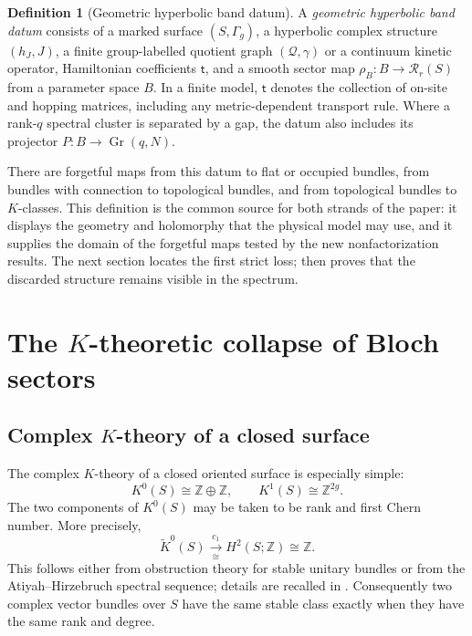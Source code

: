 \documentclass[11pt]{article}
\theoremstyle{definition}
\newtheorem{definition}[theorem]{Definition}
\theoremstyle{remark}
\newcommand{\ZZ}{\mathbb Z}
\newcommand{\cR}{\mathcal R}
\begin{document}
\begin{definition}[Geometric hyperbolic band datum]
\label{def:geometric-band-datum}
A \emph{geometric hyperbolic band datum} consists of a marked surface
\((S,\Gamma_g)\), a hyperbolic complex structure \((h_J,J)\), a finite
group-labelled quotient graph \((\mathcal Q,\gamma)\) or a continuum kinetic
operator, Hamiltonian coefficients \(\mathsf t\), and a smooth sector map
\(\rho_B:B\to\cR_r(S)\) from a parameter space \(B\).  In a finite model,
\(\mathsf t\) denotes the collection of on-site and hopping matrices,
including any metric-dependent transport rule.  Where a rank-\(q\) spectral
cluster is separated by a gap, the datum also includes its projector
\(P:B\to\operatorname{Gr}(q,N)\).
\end{definition}

There are forgetful maps from this datum to flat or occupied bundles, from
bundles with connection to topological bundles, and from topological bundles
to \(K\)-classes.  This definition is the common source for both strands of
the paper: it displays the geometry and holomorphy that the physical model
may use, and it supplies the domain of the forgetful maps tested by the new
nonfactorization results.  The next section locates the first strict loss;
 then proves that the discarded structure remains visible in
the spectrum.

\section{The \texorpdfstring{\(K\)}{K}-theoretic collapse of Bloch sectors}
\label{sec:k-collapse}

\subsection{Complex \texorpdfstring{\(K\)}{K}-theory of a closed surface}

The complex \(K\)-theory of a closed oriented surface is especially simple:
\[
       K^0(S)\cong \ZZ\oplus\ZZ,
       \qquad
       K^1(S)\cong\ZZ^{2g}.
       \tag{3.1}\label{eq:k-surface}
\]
The two components of \(K^0(S)\) may be taken to be rank and first Chern
number.  More precisely,
\[
 \widetilde K^0(S)\xrightarrow[\cong]{\ c_1\ }H^2(S;\ZZ)\cong\ZZ .
 \tag{3.2}\label{eq:reduced-k}
\]
This follows either from obstruction theory for stable unitary bundles or
from the Atiyah--Hirzebruch spectral sequence; details are recalled in
.  Consequently two complex vector bundles over \(S\)
have the same stable class exactly when they have the same rank and degree.
\end{document}
